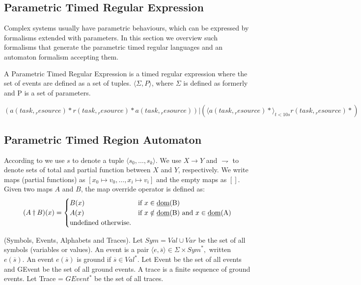 			
		\subsection{Parametric Timed Regular Expression}
			Complex systems usually have parametric behaviours, which can be expressed by formalisms extended with parameters. In this section we overview such formalisms
			that generate the parametric timed regular languages and an automaton formalism accepting them.
			
			\begin{dfn}
			A Parametric Timed Regular Expression is a timed regular expression where the set of events are defined as a set of tuples. $\langle \Sigma, P \rangle$,
			where $\Sigma$ is defined as formerly and P is a set of parameters.
			\end{dfn}
			
			
			
			$(a(\mathit{task},\mathit{_resource})\ast r(\mathit{task},\mathit{_resource})\ast a(\mathit{task},\mathit{_resource}))|( \langle a(\mathit{task},\mathit{_resource}) \ast \rangle_{t < 10 s} r(\mathit{task},\mathit{_resource}) \ast)$
		
			\subsection{Parametric Timed Region Automaton}
				
				According to \cite{qea} we use $s$ to denote a tuple $\langle s_0,\dots,s_k \rangle$. We use $X \rightarrow Y$ and $\rightharpoondown$ to denote sets of total and partial function between
				$X$ and $Y$, respectively. We write maps (partial functions) as $[x_0 \mapsto v_0,\dots,x_i \mapsto v_i]$ and the empty maps as $[]$. Given two maps $A$ and $B$,
				the map override operator is defined as:
					\[
					 (A \dagger B)(x) = 
					  \begin{cases} 
					   B(x) & \text{if } x \in \text{\underline{dom}(B)} \\
					   A(x) & \text{if } x \notin \text{\underline{dom}(B)} \text{ and } x \in \text{\underline{dom}(A)} \\
					   \text{undefined otherwise.}
					  \end{cases}
					\]
					
				
				
				\begin{dfn}
					(Symbols, Events, Alphabets and Traces).
					Let $\mathit{Sym} = \mathit{Val} \cup \mathit{Var}$ be the set of all symbols (variables or values).
					An event is a pair $\langle e, \overline{s} \rangle \in \Sigma \times \mathit{Sym}^\ast,$ written $e(\overline{s})$.
					An event $e(\overline{s})$ is ground if $\overline{s} \in \mathit{Val}^\ast$.
					Let Event be the set of all events and GEvent be the set of all ground events.
					A trace is a finite sequence of ground events.
					Let Trace = $GEvent^\ast$ be the set of all traces\citep{qea}. 
				\end{dfn}
				

